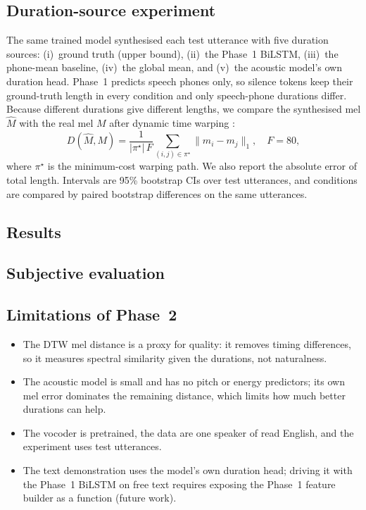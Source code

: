 \subsection{Duration-source experiment}
The same trained model synthesised each test utterance with five duration sources: (i)~ground truth (upper bound), (ii)~the Phase~1 BiLSTM, (iii)~the phone-mean baseline, (iv)~the global mean, and (v)~the acoustic model's own duration head. Phase~1 predicts speech phones only, so silence tokens keep their ground-truth length in every condition and only speech-phone durations differ. Because different durations give different lengths, we compare the synthesised mel $\hat M$ with the real mel $M$ after dynamic time warping \cite{sakoe1978}:
\begin{equation}
D(\hat M, M)=\frac{1}{|\pi^\star|\,F}\sum_{(i,j)\in\pi^\star}\lVert \hat m_i-m_j\rVert_1,\quad F=80,
\end{equation}
where $\pi^\star$ is the minimum-cost warping path. We also report the absolute error of total length. Intervals are 95\% bootstrap CIs over \ptEvalN{} test utterances, and conditions are compared by paired bootstrap differences on the same utterances.

\subsection{Results}
\ptFindings{}


\subsection{Subjective evaluation}
\listeningParagraph{}

\subsection{Limitations of Phase~2}
\begin{itemize}
\item The DTW mel distance is a proxy for quality: it removes timing differences, so it measures spectral similarity given the durations, not naturalness.
\item The acoustic model is small and has no pitch or energy predictors; its own mel error dominates the remaining distance, which limits how much better durations can help.
\item The vocoder is pretrained, the data are one speaker of read English, and the experiment uses \ptEvalN{} test utterances.
\item The text demonstration uses the model's own duration head; driving it with the Phase~1 BiLSTM on free text requires exposing the Phase~1 feature builder as a function (future work).
\end{itemize}
